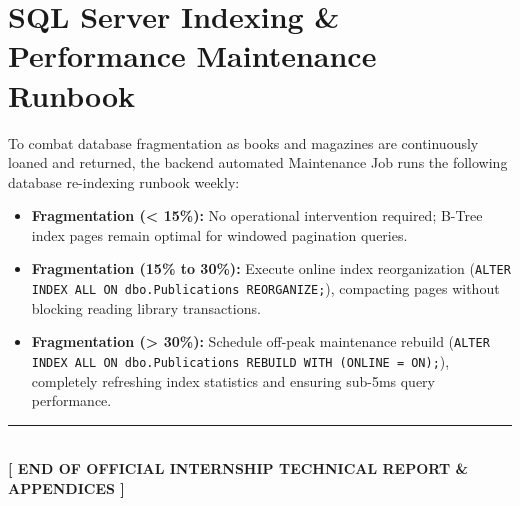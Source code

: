\documentclass[11pt,a4paper]{report}
\begin{document}
\section{SQL Server Indexing \& Performance Maintenance Runbook}
To combat database fragmentation as books and magazines are continuously loaned and returned, the backend automated Maintenance Job runs the following database re-indexing runbook weekly:
\begin{itemize}[leftmargin=1.5em]
    \item \textbf{Fragmentation (< 15\%):} No operational intervention required; B-Tree index pages remain optimal for windowed pagination queries.
    \item \textbf{Fragmentation (15\% to 30\%):} Execute online index reorganization (\texttt{ALTER INDEX ALL ON dbo.Publications REORGANIZE;}), compacting pages without blocking reading library transactions.
    \item \textbf{Fragmentation (> 30\%):} Schedule off-peak maintenance rebuild (\texttt{ALTER INDEX ALL ON dbo.Publications REBUILD WITH (ONLINE = ON);}), completely refreshing index statistics and ensuring sub-5ms query performance.
\end{itemize}

\vspace{30pt}
\begin{center}
    {\color{accentgold}\rule{0.5\textwidth}{2pt}}\\[15pt]
    {\large \textbf{\color{navyblue} [ END OF OFFICIAL INTERNSHIP TECHNICAL REPORT \& APPENDICES ]}}
\end{center}
\end{document}
